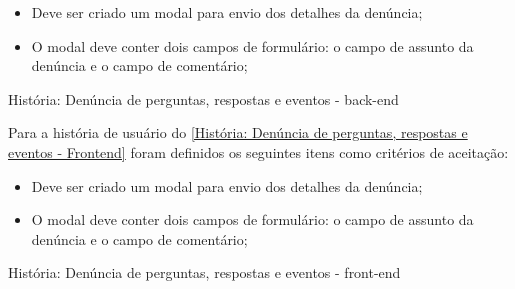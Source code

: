 \begin{itemize}
\item Deve ser criado um modal para envio dos detalhes da denúncia;
\item O modal deve conter dois campos de formulário: o campo de assunto da denúncia e o campo de comentário; 
\end{itemize}

\def\arraystretch{2}
\begin{quadro}[htb]
\centering
\ABNTEXfontereduzida
\caption[História: Denúncia de perguntas, respostas e eventos - Backend]{História: Denúncia de perguntas, respostas e eventos - back-end}
\label{História: Denúncia de perguntas, respostas e eventos - Backend}
\end{quadro}
\FloatBarrier 

Para a história de usuário do \autoref{História: Denúncia de perguntas, respostas e eventos - Frontend} foram definidos os seguintes itens como critérios de aceitação:

\begin{itemize}
\item Deve ser criado um modal para envio dos detalhes da denúncia;
\item O modal deve conter dois campos de formulário: o campo de assunto da denúncia e o campo de comentário; 
\end{itemize}

\def\arraystretch{2}
\begin{quadro}[htb]
\centering
\ABNTEXfontereduzida
\caption[História: Denúncia de perguntas, respostas e eventos - Frontend]{História: Denúncia de perguntas, respostas e eventos - front-end}
\label{História: Denúncia de perguntas, respostas e eventos - Frontend}
\end{quadro}
\FloatBarrier 

